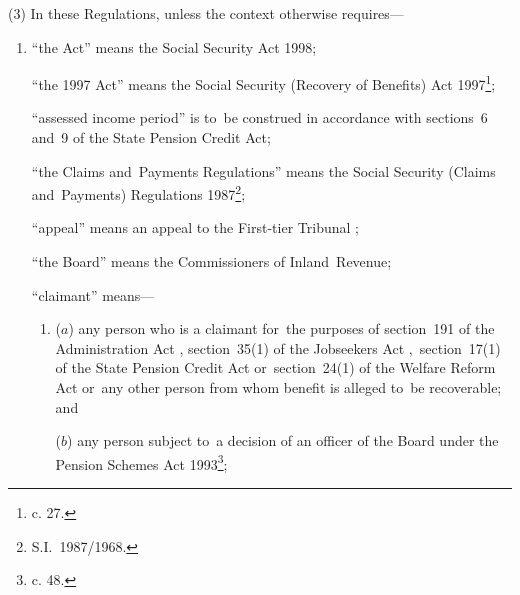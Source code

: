 \documentclass[12pt,a4paper]{article}
\begin{document}
(3) In these Regulations, unless the context otherwise requires—
\begin{enumerate}\item[]
“the Act” means the Social Security Act 1998;

“the 1997 Act” means the Social Security (Recovery of Benefits) Act 1997\footnote{ c. 27.};

“assessed income period” is to~be construed in accordance with sections~6 and~9 of the State Pension Credit Act;

“the Claims and~Payments Regulations” means the Social Security (Claims and~Payments) Regulations 1987\footnote{\frenchspacing S.I.~1987/1968.};

“appeal” means an appeal to 
the First-tier Tribunal%
;

“the Board” means the Commissioners of Inland~Revenue;

“claimant” means—
\begin{enumerate}\item[]
($a$) any person who is a claimant for~the purposes of section~191 of the Administration Act%
, section~35(1) of the Jobseekers Act%
,~section~17(1) of the State Pension Credit Act or~section~24(1) of the Welfare Reform Act  %
or~any other person from whom benefit is alleged to~be recoverable; and

($b$) any person subject to~a decision of 
an officer of the Board  %
under the Pension Schemes Act 1993\footnote{ c. 48.};
\end{enumerate}




\end{enumerate}
\end{document}
